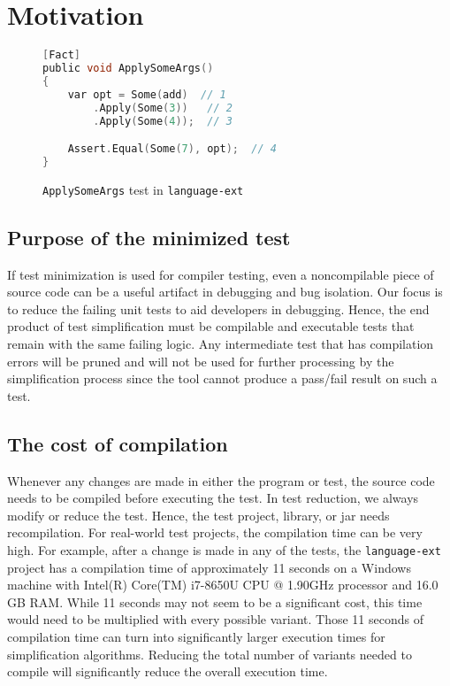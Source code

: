 \clearpage %

\chapter{Motivation}\label{CH3_Motivation}


\begin{figure}
\begin{lstlisting}[language=C, linewidth=0.6\linewidth]
[Fact]
public void ApplySomeArgs()
{
	var opt = Some(add)  // 1
		.Apply(Some(3))   // 2
		.Apply(Some(4));  // 3

	Assert.Equal(Some(7), opt);  // 4
}
\end{lstlisting}

\caption{\texttt{ApplySomeArgs} test in \texttt{language-ext}}
\label{fig:applySomeArgs}
\end{figure}


\section{Purpose of the minimized test}
If test minimization is used for compiler testing, even a noncompilable piece of source code can be a useful artifact in debugging and bug isolation. Our focus is to reduce the failing unit tests to aid developers in debugging. Hence, the end product of test simplification must be compilable and executable tests that remain with the same failing logic. Any intermediate test that has compilation errors will be pruned and will not be used for further processing by the simplification process since the tool cannot produce a pass/fail result on such a test.


\section{The cost of compilation}
Whenever any changes are made in either the program or test, the source code needs to be compiled before executing the test. In test reduction, we always modify or reduce the test. Hence, the test project, library, or jar needs recompilation. For real-world test projects, the compilation time can be very high. For example, after a change is made in any of the tests, the \texttt{language-ext} project has a compilation time of approximately 11 seconds on a Windows machine with Intel(R) Core(TM) i7-8650U CPU @ 1.90GHz processor and 16.0 GB RAM. While 11 seconds may not seem to be a significant cost, this time would need to be multiplied with every possible variant. Those 11 seconds of compilation time can turn into significantly larger execution times for simplification algorithms. Reducing the total number of variants needed to compile will significantly reduce the overall execution time.


